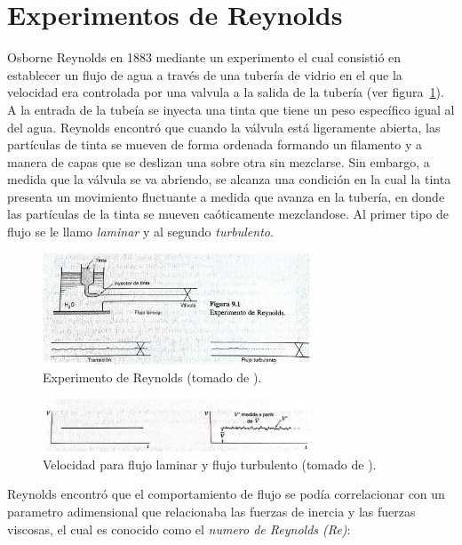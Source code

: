 \documentclass[11pt, oneside]{article}
\begin{document}
\section{Experimentos de Reynolds} %
Osborne Reynolds en 1883 mediante un experimento el cual consisti\'o en establecer un flujo de agua a trav\'es de una tuber\'ia de vidrio en el que la velocidad era controlada por una valvula a la salida de la tuber\'ia (ver figura~\ref{reyn}). A la entrada de la tube\'ia se inyecta una tinta que tiene un peso espec\'ifico igual al del agua. Reynolds encontr\'o que cuando la v\'alvula est\'a ligeramente abierta, las part\'iculas de tinta se mueven de forma ordenada formando un filamento y a manera de capas que se deslizan una sobre otra sin mezclarse. Sin embargo, a medida que la v\'alvula se va abriendo, se alcanza una condici\'on en la cual la tinta presenta un movimiento fluctuante a medida que avanza en la tuber\'ia, en donde las part\'iculas de la tinta se mueven ca\'oticamente mezclandose. Al primer tipo de flujo se le llamo \emph{laminar} y al segundo \emph{turbulento}.

\begin{figure}[h]
\centering
\includegraphics[width=8cm]{reyn.jpeg}
\caption{Experimento de Reynolds (tomado de \cite{irving2010fluid}).}
\label{reyn}
\end{figure}

\begin{figure}[h]
\centering
\includegraphics[width=8cm]{reyn1.jpeg}
\caption{Velocidad para flujo laminar y flujo turbulento (tomado de \cite{irving2010fluid}).}
\label{reyn1}
\end{figure}

Reynolds encontr\'o que el comportamiento de flujo se pod\'ia correlacionar con un parametro adimensional que relacionaba las fuerzas de inercia y las fuerzas viscosas, el cual es conocido como el \emph{numero de Reynolds (Re)}:
\end{document}
